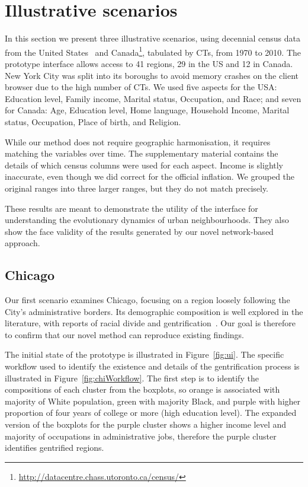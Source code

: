 \section{Illustrative scenarios}
\label{sec:study}

In this section we present three illustrative scenarios, using decennial census
data from the United States~\citep{nhgis} and
Canada\footnote{\url{http://datacentre.chass.utoronto.ca/census/}}, tabulated by
CTs,  from 1970 to 2010. The prototype interface allows access to 41 regions, 29
in the US and 12 in Canada. New York City was split into its boroughs to avoid
memory crashes on the client browser due to the high number of CTs.  We used
five aspects for the USA: Education level, Family income, Marital status,
Occupation, and Race; and seven for Canada: Age, Education level, Home language,
Household Income, Marital status, Occupation, Place of birth, and Religion. 

While our method does not require geographic harmonisation, it requires matching
the variables over time. The supplementary material contains the details of
which census columns were used for each aspect. Income is slightly inaccurate,
even though we did correct for the official inflation. We grouped the original
ranges into three larger ranges, but they do not match precisely.

These results are meant to demonstrate the utility of the interface for
understanding the evolutionary dynamics of urban neighbourhoods. They also show
the face validity of the results generated by our novel network-based approach.

\subsection{Chicago}
Our first scenario examines Chicago, focusing on a region loosely following the
City's administrative borders. Its demographic composition is well explored in
the literature, with reports of racial divide and
gentrification~\citep{Delmelle2016,Delmelle2017,Hwang2014}. Our goal is
therefore to confirm that our novel method can reproduce existing findings. 


The initial state of the prototype is illustrated in Figure~\ref{fig:ui}. The
specific workflow used to identify the existence and details of the
gentrification process is illustrated in Figure~\ref{fig:chiWorkflow}. The first
step is to identify the compositions of each cluster from the boxplots, so
orange is associated with majority of White population, green with majority
Black, and purple with higher proportion of four years of college or more (high
education level). The expanded version of the boxplots for the purple cluster
shows a higher income level and majority of occupations in administrative jobs,
therefore the purple cluster identifies gentrified regions.



